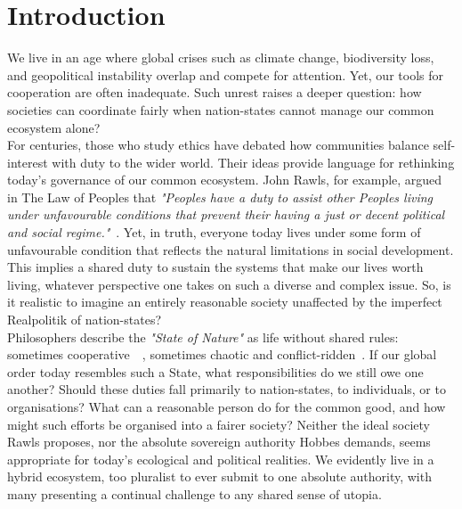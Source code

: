 \section{Introduction}

We live in an age where global crises such as climate change, biodiversity loss, and geopolitical instability overlap and compete for attention.
Yet, our tools for cooperation are often inadequate.
Such unrest raises a deeper question: how societies can coordinate fairly when nation-states cannot manage our common ecosystem alone?\\

For centuries, those who study ethics have debated how communities balance self-interest with duty to the wider world.
Their ideas provide language for rethinking today’s governance of our common ecosystem.
John Rawls, for example, argued in The Law of Peoples that \emph{"Peoples have a duty to assist other Peoples living under unfavourable conditions that prevent their having a just or decent political and social regime."}~\cite{jr2}.
Yet, in truth, everyone today lives under some form of unfavourable condition that reflects the natural limitations in social development.
This implies a shared duty to sustain the systems that make our lives worth living, whatever perspective one takes on such a diverse and complex issue.
So, is it realistic to imagine an entirely reasonable society unaffected by the imperfect Realpolitik of nation-states?\\

Philosophers describe the \emph{"State of Nature"} as life without shared rules: sometimes cooperative~\cite{jl1}~\cite{rn1}, sometimes chaotic and conflict-ridden~\cite{th1}.
If our global order today resembles such a State, what responsibilities do we still owe one another?
Should these duties fall primarily to nation-states, to individuals, or to organisations?
What can a reasonable person do for the common good, and how might such efforts be organised into a fairer society?
Neither the ideal society Rawls proposes, nor the absolute sovereign authority Hobbes demands, seems appropriate for today’s ecological and political realities.
We evidently live in a hybrid ecosystem, too pluralist to ever submit to one absolute authority, with many presenting a continual challenge to any shared sense of utopia.\\

